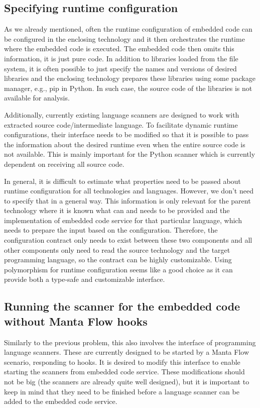 \subsection{Specifying runtime configuration}
As we already mentioned, often the runtime configuration of embedded code can be configured in the enclosing technology and it then orchestrates the runtime where the embedded code is executed. The embedded code then omits this information, it is just pure code. In addition to libraries loaded from the file system, it is often possible to just specify the names and versions of desired libraries and the enclosing technology prepares these libraries using some package manager, e.g., pip in Python. In such case, the source code of the libraries is not available for analysis.
\par
Additionally, currently existing language scanners are designed to work with extracted source code/intermediate language. To facilitate dynamic runtime configurations, their interface needs to be modified so that it is possible to pass the information about the desired runtime even when the entire source code is not available. This is mainly important for the Python scanner which is currently dependent on receiving all source code.
\par
In general, it is difficult to estimate what properties need to be passed about runtime configuration for all technologies and languages. However, we don’t need to specify that in a general way. This information is only relevant for the parent technology where it is known what can and needs to be provided and the implementation of embedded code service for that particular language, which needs to prepare the input based on the configuration. Therefore, the configuration contract only needs to exist between these two components and all other components only need to read the source technology and the target programming language, so the contract can be highly customizable. Using polymorphism for runtime configuration seems like a good choice as it can provide both a type-safe and customizable interface.

\subsection{Running the scanner for the embedded code without Manta Flow hooks}
Similarly to the previous problem, this also involves the interface of programming language scanners. These are currently designed to be started by a Manta Flow scenario, responding to hooks. It is desired to modify this interface to enable starting the scanners from embedded code service. These modifications should not be big (the scanners are already quite well designed), but it is important to keep in mind that they need to be finished before a language scanner can be added to the embedded code service. 

